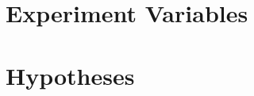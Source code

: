 \begin{comment}
    Following is copy\&pasted from pollys ScopDetectionDiagnostic.cpp

SCOP_STAT(CFG, ""),
SCOP_STAT(InvalidTerminator, "Unsupported terminator instruction"),
SCOP_STAT(UnreachableInExit, "Unreachable in exit block"),
SCOP_STAT(IrreducibleRegion, "Irreducible loops"),
SCOP_STAT(LastCFG, ""),
SCOP_STAT(AffFunc, ""),
SCOP_STAT(UndefCond, "Undefined branch condition"),
SCOP_STAT(InvalidCond, "Non-integer branch condition"),
SCOP_STAT(UndefOperand, "Undefined operands in comparison"),
SCOP_STAT(NonAffBranch, "Non-affine branch condition"),
SCOP_STAT(NoBasePtr, "No base pointer"),
SCOP_STAT(UndefBasePtr, "Undefined base pointer"),
SCOP_STAT(VariantBasePtr, "Variant base pointer"),
SCOP_STAT(NonAffineAccess, "Non-affine memory accesses"),
SCOP_STAT(DifferentElementSize, "Accesses with differing sizes"),
SCOP_STAT(LastAffFunc, ""),
SCOP_STAT(LoopBound, "Uncomputable loop bounds"),
SCOP_STAT(LoopHasNoExit, "Loop without exit"),
SCOP_STAT(FuncCall, "Function call with side effects"),
SCOP_STAT(NonSimpleMemoryAccess,
          "Compilated access semantics (volatile or atomic)"),
SCOP_STAT(Alias, "Base address aliasing"),
SCOP_STAT(Other, ""),
SCOP_STAT(IntToPtr, "Integer to pointer conversions"),
SCOP_STAT(Alloca, "Stack allocations"),
SCOP_STAT(UnknownInst, "Unknown Instructions"),
SCOP_STAT(Entry, "Contains entry block"),
SCOP_STAT(Unprofitable, "Assumed to be unprofitable"),
SCOP_STAT(LastOther, "")
\end{comment}

\section{Experiment Variables}

\section{Hypotheses}

